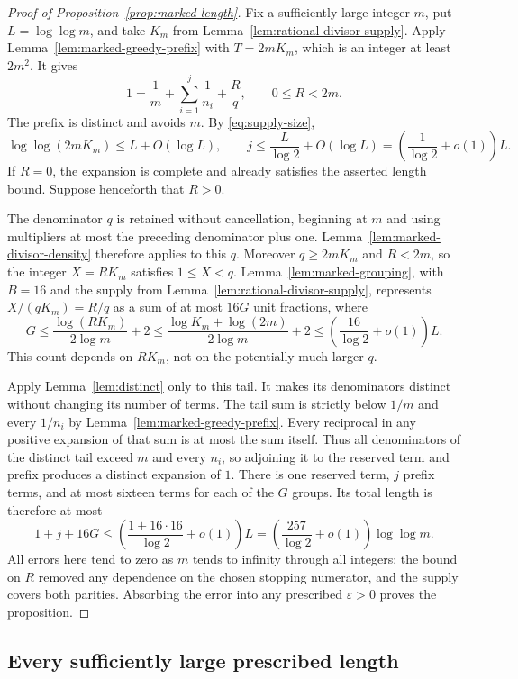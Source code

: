 \begin{proof}[Proof of Proposition~\ref{prop:marked-length}]
Fix a sufficiently large integer $m$, put $L=\log\log m$, and take
$K_m$ from Lemma~\ref{lem:rational-divisor-supply}. Apply
Lemma~\ref{lem:marked-greedy-prefix} with $T=2mK_m$, which is an
integer at least $2m^2$. It gives
\[
 1=\frac1m+\sum_{i=1}^{j}\frac1{n_i}+\frac Rq,
 \qquad 0\le R<2m.
\]
The prefix is distinct and avoids $m$. By \eqref{eq:supply-size},
\[
 \log\log(2mK_m)\le L+O(\log L),
 \qquad
 j\le\frac{L}{\log2}+O(\log L)
   =\left(\frac1{\log2}+o(1)\right)L.
\]
If $R=0$, the expansion is complete and already satisfies the asserted
length bound. Suppose henceforth that $R>0$.

The denominator $q$ is retained without cancellation, beginning at $m$
and using multipliers at most the preceding denominator plus one.
Lemma~\ref{lem:marked-divisor-density} therefore applies to this $q$.
Moreover $q\ge2mK_m$ and $R<2m$, so the integer $X=RK_m$ satisfies
$1\le X<q$. Lemma~\ref{lem:marked-grouping}, with $B=16$ and the
supply from Lemma~\ref{lem:rational-divisor-supply}, represents
$X/(qK_m)=R/q$ as a sum of at most $16G$ unit fractions, where
\[
 G\le\frac{\log(RK_m)}{2\log m}+2
 \le\frac{\log K_m+\log(2m)}{2\log m}+2
 \le\left(\frac{16}{\log2}+o(1)\right)L.
\]
This count depends on $RK_m$, not on the potentially much larger $q$.

Apply Lemma~\ref{lem:distinct} only to this tail. It makes its
denominators distinct without changing its number of terms. The tail
sum is strictly below $1/m$ and every $1/n_i$ by
Lemma~\ref{lem:marked-greedy-prefix}. Every reciprocal in any positive
expansion of that sum is at most the sum itself. Thus all denominators
of the distinct tail exceed $m$ and every $n_i$, so adjoining it to the
reserved term and prefix produces a distinct expansion of $1$.
There is one reserved term, $j$ prefix terms, and at most sixteen terms
for each of the $G$ groups. Its total length is therefore at most
\[
 1+j+16G
 \le\left(\frac{1+16\cdot16}{\log2}+o(1)\right)L
 =\left(\frac{257}{\log2}+o(1)\right)\log\log m.
\]
All errors here tend to zero as $m$ tends to infinity through all
integers: the bound on $R$ removed any dependence on the chosen
stopping numerator, and the supply covers both parities. Absorbing
the error into any prescribed $\varepsilon>0$ proves the proposition.
\end{proof}

\subsection{Every sufficiently large prescribed length}

